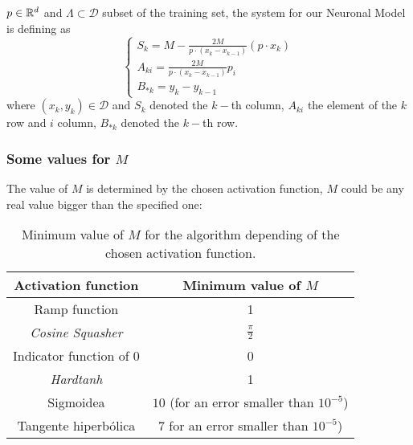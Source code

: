  $p \in \mathbb{R}^d$ and $\Lambda \subset \mathcal{D}$ subset of the training set, the system for our Neuronal Model is defining as 
\begin{equation}\label{eq: neural system}
    \left\{ 
        \begin{array}{l}
            S_{k} =
                M -  \frac{2 M}{p \cdot (x_k - x_{k-1})}(p \cdot x_{k})
            \\
            A_{k i} = \frac{2 M}{p \cdot (x_k - x_{k-1})}
            p_{i} 
            \\
            B_{* k} = y_k - y_{k-1}
        \end{array}
    \right.
\end{equation}  
where $(x_k, y_k) \in \mathcal{D}$ and $S_{k}$ denoted the $k-$th column, $A_{k i}$ the element of the $k$ row and $i$ column, $B_{* k}$ denoted the $k-$th row. 

\subsubsection*{Some values for $M$}
\label{subsec:values of M}
The value of $M$ is determined by the chosen activation function, $M$ could be any real value bigger than the specified one: 

\begin{table}[h]
    \centering
    \begin{tabular}{|c|c|}
    \hline
        Activation function  & Minimum value of $M$ \\ \hline
        Ramp function & 1 \\ \hline
        \textit{Cosine Squasher} & $\frac{\pi}{2}$ \\ \hline
        Indicator function of 0 & 0 \\ \hline
        \textit{Hardtanh} & 1 \\ \hline
        Sigmoidea  &  $10$ (for an error smaller than $10^{-5}$)\\ \hline
        Tangente hiperbólica  &  $7$ for an error smaller than $10^{-5}$)\\ \hline
    \end{tabular}
    \caption{
        Minimum value of $M$ for the algorithm depending of the chosen activation function.
    }
    \label{table:M-activation-function}
\end{table}





